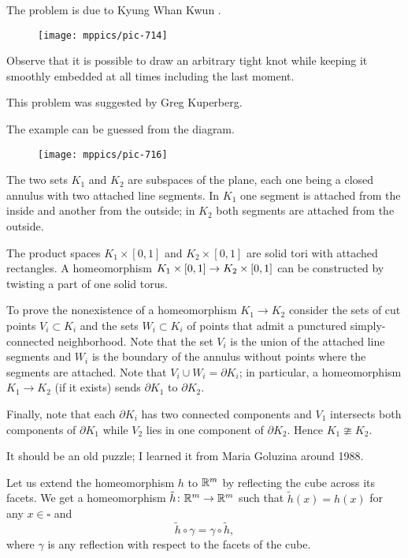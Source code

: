 The problem is due to Kyung Whan Kwun \cite{kwun}.


\begin{figure}[!ht]
\vskip0mm
\centering
\texttt{[image: mppics/pic-714]}
\end{figure}

Observe that it is possible to draw an arbitrary tight knot 
while keeping it smoothly embedded at all times including the last moment.\qeds

This problem was suggested by Greg Kuperberg.


The example can be guessed from the diagram.

\begin{wrapfigure}[6]{r}{50 mm}
\vskip-0mm
\centering
\texttt{[image: mppics/pic-716]}
\end{wrapfigure}

The two sets $K_1$ and $K_2$ are subspaces of the plane, 
each one being a closed annulus with two attached line segments.
In $K_1$ one segment is attached from the inside and another from the outside; 
in $K_2$ both segments are attached from the outside.

The product spaces $K_1\times[0,1]$ and $K_2\times[0,1]$ are solid tori with attached rectangles.
A homeomorphism $K_1\times[0,1]\z\to K_2\times[0,1]$ can be constructed by twisting a part of one solid torus.

To prove the nonexistence of a homeomorphism $K_1\to K_2$ consider the sets of cut points $V_i\subset K_i$ and the sets $W_i\subset K_i$ of points that admit a punctured simply-connected neighborhood.
Note that the set $V_i$ is the union of the attached line segments 
and $W_i$ is the boundary of the annulus without points where the segments are attached.
Note that $V_i\cup W_i=\partial K_i$;
in particular, a homeomorphism $K_1\to K_2$ (if it exists) sends $\partial K_1$ to $\partial K_2$.

Finally, note that each $\partial K_i$ has two connected components and 
$V_1$ intersects both components of $\partial K_1$
while $V_2$ lies in one component of $\partial K_2$.
Hence $K_1\ncong K_2$.
\qeds

It should be an old puzzle;
I learned it from Maria Goluzina around 1988.


Let us extend the homeomorphism $h$ to $\mathbb{R}^m$ by reflecting the cube across its facets.
We get a homeomorphism $\tilde h\colon\mathbb{R}^m\to\mathbb{R}^m$ such that $\tilde h(x)=h(x)$ for any $x\in\square$ and 
\[\tilde h\circ\gamma=\gamma\circ \tilde h,\]
where $\gamma$ is any reflection with respect to the facets of the cube.

